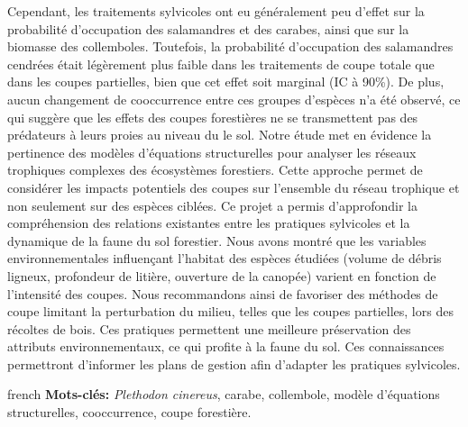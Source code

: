 Cependant, les traitements sylvicoles ont eu généralement peu d’effet sur la probabilité d’occupation des salamandres et des carabes, ainsi que sur la biomasse des collemboles. 
Toutefois, la probabilité d’occupation des salamandres cendrées était légèrement plus faible dans les traitements de coupe totale que dans les coupes partielles, bien que cet effet soit marginal (IC à 90\%). 
De plus, aucun changement de cooccurrence entre ces groupes d’espèces n’a été observé, ce qui suggère que les effets des coupes forestières ne se transmettent pas des prédateurs à leurs proies au niveau du le sol. 
Notre étude met en évidence la pertinence des modèles d’équations structurelles pour analyser les réseaux trophiques complexes des écosystèmes forestiers. 
Cette approche permet de considérer les impacts potentiels des coupes sur l’ensemble du réseau trophique et non seulement sur des espèces ciblées. 
Ce projet a permis d’approfondir la compréhension des relations existantes entre les pratiques sylvicoles et la dynamique de la faune du sol forestier. 
Nous avons montré que les variables environnementales influençant l’habitat des espèces étudiées (volume de débris ligneux, profondeur de litière, ouverture de la canopée) varient en fonction de l’intensité des coupes. 
Nous recommandons ainsi de favoriser des méthodes de coupe limitant la perturbation du milieu, telles que les coupes partielles, lors des récoltes de bois. 
Ces pratiques permettent une meilleure préservation des attributs environnementaux, ce qui profite à la faune du sol. 
Ces connaissances permettront d’informer les plans de gestion afin d’adapter les pratiques sylvicoles.


\begin{otherlanguage*}{french}
\textbf{Mots-clés:} \textit{Plethodon cinereus}, carabe, collembole, modèle d'équations structurelles, cooccurrence, coupe forestière.
\end{otherlanguage*}
